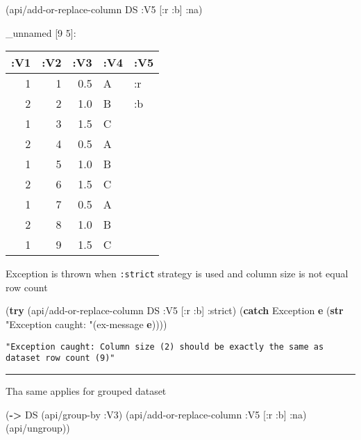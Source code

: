 \documentclass[]{article}
\newenvironment{Shaded}{\begin{snugshade}}{\end{snugshade}}
\newcommand{\KeywordTok}[1]{\textcolor[rgb]{0.13,0.29,0.53}{\textbf{#1}}}
\newcommand{\StringTok}[1]{\textcolor[rgb]{0.31,0.60,0.02}{#1}}
\newcommand{\AttributeTok}[1]{\textcolor[rgb]{0.77,0.63,0.00}{#1}}
\newcommand{\NormalTok}[1]{#1}
\begin{document}
\begin{Shaded}
\begin{Highlighting}[]
\NormalTok{(api/add-or-replace-column DS }\AttributeTok{:V5}\NormalTok{ [}\AttributeTok{:r} \AttributeTok{:b}\NormalTok{] }\AttributeTok{:na}\NormalTok{)}
\end{Highlighting}
\end{Shaded}

\_unnamed {[}9 5{]}:

\begin{longtable}[]{@{}rrrll@{}}
\toprule
:V1 & :V2 & :V3 & :V4 & :V5\tabularnewline
\midrule
\endhead
1 & 1 & 0.5 & A & :r\tabularnewline
2 & 2 & 1.0 & B & :b\tabularnewline
1 & 3 & 1.5 & C &\tabularnewline
2 & 4 & 0.5 & A &\tabularnewline
1 & 5 & 1.0 & B &\tabularnewline
2 & 6 & 1.5 & C &\tabularnewline
1 & 7 & 0.5 & A &\tabularnewline
2 & 8 & 1.0 & B &\tabularnewline
1 & 9 & 1.5 & C &\tabularnewline
\bottomrule
\end{longtable}

Exception is thrown when \texttt{:strict} strategy is used and column
size is not equal row count

\begin{Shaded}
\begin{Highlighting}[]
\NormalTok{(}\KeywordTok{try}
\NormalTok{  (api/add-or-replace-column DS }\AttributeTok{:V5}\NormalTok{ [}\AttributeTok{:r} \AttributeTok{:b}\NormalTok{] }\AttributeTok{:strict}\NormalTok{)}
\NormalTok{  (}\KeywordTok{catch}\NormalTok{ Exception }\KeywordTok{e}\NormalTok{ (}\KeywordTok{str} \StringTok{"Exception caught: "}\NormalTok{(ex-message }\KeywordTok{e}\NormalTok{))))}
\end{Highlighting}
\end{Shaded}

\begin{verbatim}
"Exception caught: Column size (2) should be exactly the same as dataset row count (9)"
\end{verbatim}

\begin{center}\rule{0.5\linewidth}{0.5pt}\end{center}

Tha same applies for grouped dataset

\begin{Shaded}
\begin{Highlighting}[]
\NormalTok{(}\KeywordTok{->}\NormalTok{ DS}
\NormalTok{    (api/group-by }\AttributeTok{:V3}\NormalTok{)}
\NormalTok{    (api/add-or-replace-column }\AttributeTok{:V5}\NormalTok{ [}\AttributeTok{:r} \AttributeTok{:b}\NormalTok{] }\AttributeTok{:na}\NormalTok{)}
\NormalTok{    (api/ungroup))}
\end{Highlighting}
\end{Shaded}
\end{document}
